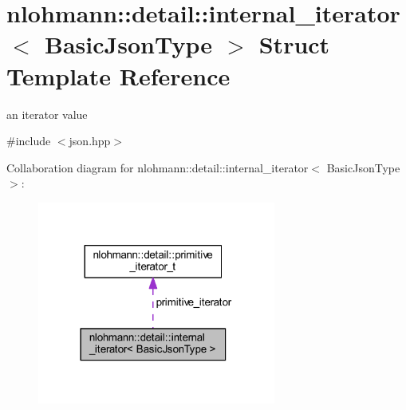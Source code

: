 \hypertarget{structnlohmann_1_1detail_1_1internal__iterator}{}\section{nlohmann\+::detail\+::internal\+\_\+iterator$<$ Basic\+Json\+Type $>$ Struct Template Reference}
\label{structnlohmann_1_1detail_1_1internal__iterator}


an iterator value  




{\ttfamily \#include $<$json.\+hpp$>$}



Collaboration diagram for nlohmann\+::detail\+::internal\+\_\+iterator$<$ Basic\+Json\+Type $>$\+:
\nopagebreak
\begin{figure}[H]
\begin{center}
\leavevmode
\includegraphics[width=222pt]{structnlohmann_1_1detail_1_1internal__iterator__coll__graph}
\end{center}
\end{figure}
